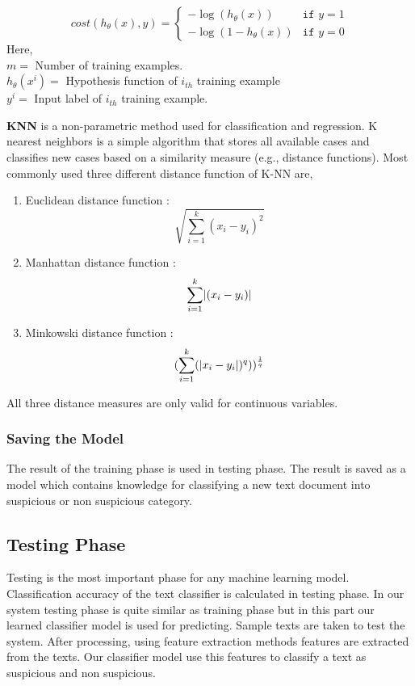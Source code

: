\[
cost(h_{\theta}(x), y) = 
\begin{cases}
    -\log (h_{\theta}(x)) & \texttt{if } y = 1\\
     -\log (1-h_{\theta}(x)) & \texttt{if } y = 0
\end{cases}
\]
Here,\\
$m = $ Number of training examples.\\
$h_{\theta}(x^{i}) = $ Hypothesis function of $i_{th}$ training example\\
$y^i = $ Input label of $i_{th}$ training example.

\vspace{0.3cm}

\textbf{KNN}\cite{harisinghaney2014text} is a non-parametric method used for
classification and regression. K nearest neighbors is a simple algorithm that stores all available cases and classifies new cases based on a similarity measure (e.g., distance functions). Most commonly used three different distance function of K-NN are,

\begin{enumerate}
    \item Euclidean distance function :
    \begin{equation}
        \sqrt{\sum_{i=1}^{k}(x_i-y_i)^2}
    \end{equation}
    \item Manhattan distance function :
    \begin{equation}
         \sum_{i=1}^{k}\lvert(x_i-y_i)\rvert
    \end{equation}
    \item Minkowski distance function :
    \begin{equation}
        ({\sum_{i=1}^{k}(\lvert x_i-y_i\rvert)^q)})^\frac{1}{q}
    \end{equation}
    
\end{enumerate}
All three distance measures are only valid for continuous variables.

\subsubsection{\textbf{Saving the Model}}
The result of the training phase is used in testing phase. The result is saved as a model which contains knowledge for classifying a new text document into suspicious or non suspicious category.

\subsection{\textbf{Testing Phase}}
Testing is the most important phase for any machine learning model. Classification accuracy of the text classifier is calculated in testing phase. In our system testing phase is quite similar as training phase but in this part our learned classifier model is used for predicting. Sample texts are taken to test the system. After processing, using feature extraction methods features are extracted from the texts. Our classifier model use this features to classify a text as suspicious and non suspicious.